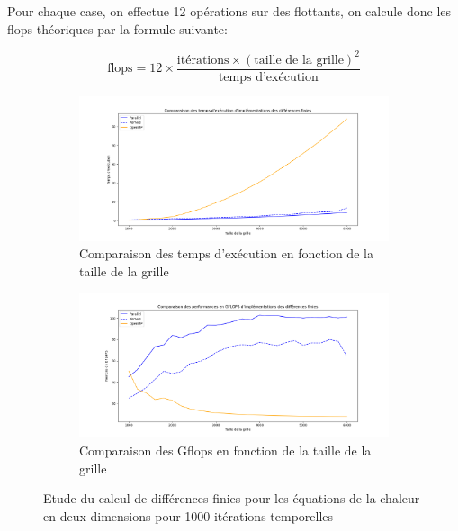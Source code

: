 \documentclass{article}
\begin{document}
Pour chaque case, on effectue 12 opérations sur des flottants, on calcule donc les \gls{flops} théoriques par la formule suivante: 

$$\mbox{flops} = 12 \times \frac{\mbox{itérations} \times (\mbox{taille de la grille})^2}{\mbox{temps d'exécution}}$$


\begin{figure}[!htb]

	\begin{subfigure}{\textwidth}
		\centering
		\includegraphics[width=\linewidth]{Time_diff.png}  
		\caption{Comparaison des temps d'exécution en fonction de la taille de la grille}
		\label{fig:time_diff}
	\end{subfigure}

	\begin{subfigure}{\textwidth}
		\centering
		\includegraphics[width=\linewidth]{Flops_diff.png}  
		\caption{Comparaison des G\gls{flops} en fonction de la taille de la grille}
		\label{fig:flops_diff}
	\end{subfigure}
	\caption{Etude du calcul de différences finies pour les équations de la chaleur en deux dimensions pour 1000 itérations temporelles}
	\label{fig:diff_acc_ker_omp}
\end{figure}
\end{document}
